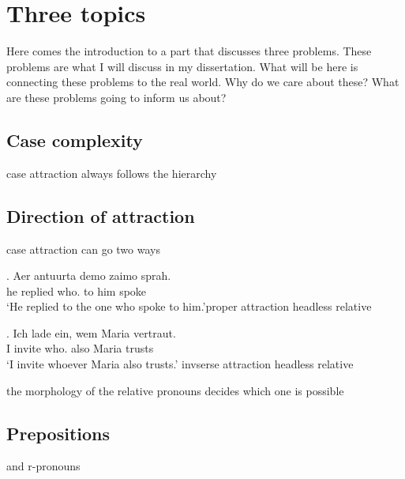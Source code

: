 \section{Three topics}

Here comes the introduction to a part that discusses three problems. These problems are what I will discuss in my dissertation. What will be here is connecting these problems to the real world. Why do we care about these? What are these problems going to inform us about?

\subsection{Case complexity}

case attraction always follows the hierarchy



\subsection{Direction of attraction}

case attraction can go two ways

\exg. Aer antuurta demo zaimo sprah.\\
he replied who. {to him} spoke\\
`He replied to the one who spoke to him.'\hfill proper attraction headless relative

\exg. Ich {lade ein}, wem Maria vertraut. \\
I invite who. also Maria trusts\\
`I invite whoever Maria also trusts.' \hfill invserse attraction headless relative

the morphology of the relative pronouns decides which one is possible



\subsection{Prepositions}

and r-pronouns
